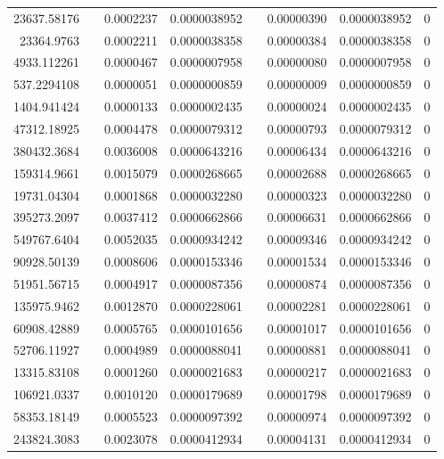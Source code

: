\documentclass[
journal=jacsat, %
manuscript=article]{achemso}
\begin{document}
\begin{table}[htbp]
{\begin{tabular}{rrrrrrrr}
    23637.58176 &       & 0.0002237 & 0.0000038952 &       & 0.00000390 & 0.0000038952 & 0 \\
    23364.9763 &       & 0.0002211 & 0.0000038358 &       & 0.00000384 & 0.0000038358 & 0 \\
    4933.112261 &       & 0.0000467 & 0.0000007958 &       & 0.00000080 & 0.0000007958 & 0 \\
    537.2294108 &       & 0.0000051 & 0.0000000859 &       & 0.00000009 & 0.0000000859 & 0 \\
    1404.941424 &       & 0.0000133 & 0.0000002435 &       & 0.00000024 & 0.0000002435 & 0 \\
    47312.18925 &       & 0.0004478 & 0.0000079312 &       & 0.00000793 & 0.0000079312 & 0 \\
    380432.3684 &       & 0.0036008 & 0.0000643216 &       & 0.00006434 & 0.0000643216 & 0 \\
    159314.9661 &       & 0.0015079 & 0.0000268665 &       & 0.00002688 & 0.0000268665 & 0 \\
    19731.04304 &       & 0.0001868 & 0.0000032280 &       & 0.00000323 & 0.0000032280 & 0 \\
    395273.2097 &       & 0.0037412 & 0.0000662866 &       & 0.00006631 & 0.0000662866 & 0 \\
    549767.6404 &       & 0.0052035 & 0.0000934242 &       & 0.00009346 & 0.0000934242 & 0 \\
    90928.50139 &       & 0.0008606 & 0.0000153346 &       & 0.00001534 & 0.0000153346 & 0 \\
    51951.56715 &       & 0.0004917 & 0.0000087356 &       & 0.00000874 & 0.0000087356 & 0 \\
    135975.9462 &       & 0.0012870 & 0.0000228061 &       & 0.00002281 & 0.0000228061 & 0 \\
    60908.42889 &       & 0.0005765 & 0.0000101656 &       & 0.00001017 & 0.0000101656 & 0 \\
    52706.11927 &       & 0.0004989 & 0.0000088041 &       & 0.00000881 & 0.0000088041 & 0 \\
    13315.83108 &       & 0.0001260 & 0.0000021683 &       & 0.00000217 & 0.0000021683 & 0 \\
    106921.0337 &       & 0.0010120 & 0.0000179689 &       & 0.00001798 & 0.0000179689 & 0 \\
    58353.18149 &       & 0.0005523 & 0.0000097392 &       & 0.00000974 & 0.0000097392 & 0 \\
    243824.3083 &       & 0.0023078 & 0.0000412934 &       & 0.00004131 & 0.0000412934 & 0 \\

\end{tabular}}
\end{table}
\end{document}
